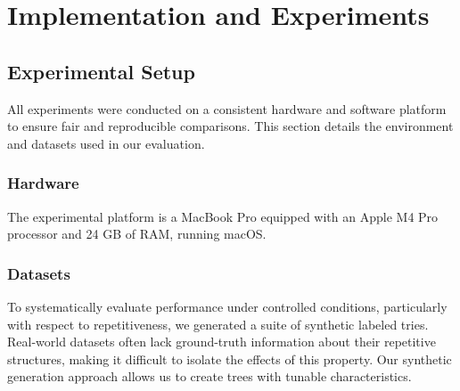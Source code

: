 \chapter{Implementation and Experiments} \label{chp:experiments}

\section{Experimental Setup}
All experiments were conducted on a consistent hardware and software platform to ensure fair and reproducible comparisons. This section details the environment and datasets used in our evaluation.

\subsection{Hardware}
The experimental platform is a MacBook Pro equipped with an Apple M4 Pro processor and 24 GB of RAM, running macOS. 

\subsection{Datasets}
To systematically evaluate performance under controlled conditions, particularly with respect to repetitiveness, we generated a suite of synthetic labeled tries. Real-world datasets often lack ground-truth information about their repetitive structures, making it difficult to isolate the effects of this property. Our synthetic generation approach allows us to create trees with tunable characteristics.

